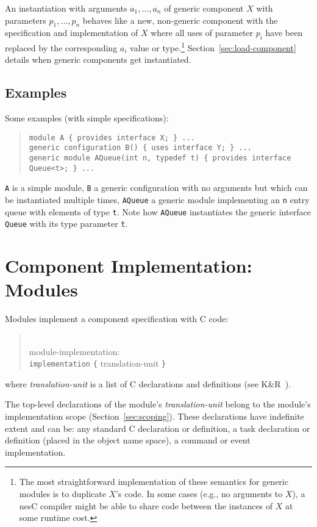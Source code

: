 \documentclass[11pt,letterpaper]{article}
\newcommand{\kw}[1]{{\tt #1}}
\newcommand{\code}[1]{{\tt #1}}
\newcommand{\nesc}{nesC\xspace}
\newcommand{\grammarshift}{\vspace*{-.7cm}}
\newcommand{\grammarindent}{\hspace*{2cm}\= \\ \kill}
\begin{document}
An instantiation with arguments $a_1, \ldots, a_n$ of generic component $X$
with parameters $p_1, \ldots, p_n$ behaves like a new, non-generic component
with the specification and implementation of $X$ where all uses of
parameter $p_i$ have been replaced by the corresponding $a_i$ value or
type.\footnote{The most straightforward implementation of these semantics
for generic modules is to duplicate $X$'s code. In some cases (e.g., no
arguments to $X$), a \nesc compiler might be able to share code between the
instances of $X$ at some runtime cost.} Section~\ref{sec:load-component}
details when generic components get instantiated.


\subsection{Examples}

Some examples (with simple specifications):
\begin{quote}
  \begin{verbatim}
module A { provides interface X; } ...
generic configuration B() { uses interface Y; } ...
generic module AQueue(int n, typedef t) { provides interface Queue<t>; } ...
  \end{verbatim}
\end{quote}
\code{A} is a simple module, \code{B} a generic configuration with no
arguments but which can be instantiated multiple times, \code{AQueue}
a generic module implementing an \code{n} entry queue with elements of
type \code{t}. Note how \code{AQueue} instantiates the generic interface
\code{Queue} with its type parameter \code{t}.

\section{Component Implementation: Modules}
\label{sec:module}

Modules implement a component specification with C code:
\begin{quote} \grammarshift \em \begin{tabbing}
\grammarindent
module-implementation:\\
\>	\kw{implementation} \kw{\{} translation-unit \kw{\}}\\
\end{tabbing} \end{quote}
where \emph{translation-unit} is a list of C declarations and definitions
(see K\&R~\cite[pp234--239]{kandr}). 

The top-level declarations of the module's \emph{translation-unit} belong
to the module's implementation scope (Section~\ref{sec:scoping}). These
declarations have indefinite extent and can be: any standard C declaration
or definition, a task declaration or definition (placed in the object name
space), a command or event implementation.
\end{document}
